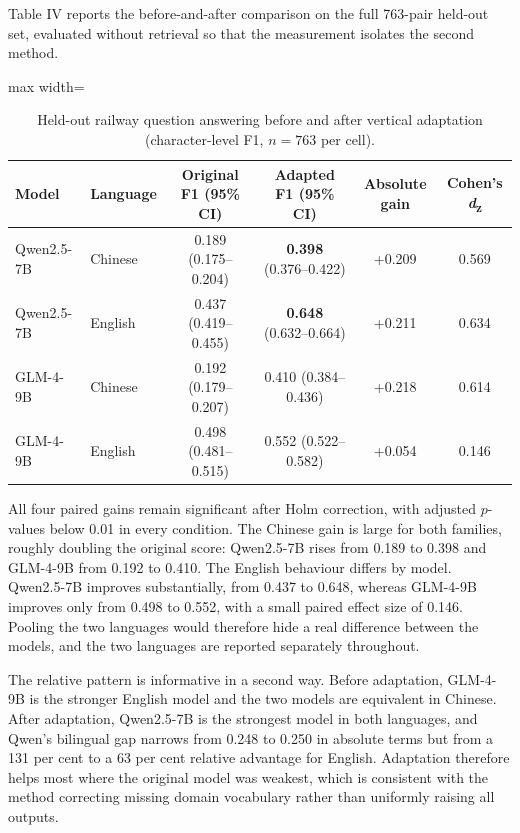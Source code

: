 \documentclass{article}
\begin{document}
Table IV reports the before-and-after comparison on the full 763-pair held-out set, evaluated without retrieval so that the measurement isolates the second method.

\begin{table}[ht]
\centering
\caption{Held-out railway question answering before and after vertical adaptation (character-level F1, $n=763$ per cell).}

\small
\begin{adjustbox}{max width=\linewidth}
\begin{tabular}{llcccc}
\toprule
Model & Language & Original F1 (95\% CI) & Adapted F1 (95\% CI) & Absolute gain & Cohen's \emph{d}\textsubscript{z} \\
\midrule
Qwen2.5-7B & Chinese & 0.189 (0.175--0.204) & \textbf{0.398} (0.376--0.422) & +0.209 & 0.569 \\
Qwen2.5-7B & English & 0.437 (0.419--0.455) & \textbf{0.648} (0.632--0.664) & +0.211 & 0.634 \\
GLM-4-9B & Chinese & 0.192 (0.179--0.207) & 0.410 (0.384--0.436) & +0.218 & 0.614 \\
GLM-4-9B & English & 0.498 (0.481--0.515) & 0.552 (0.522--0.582) & +0.054 & 0.146 \\
\bottomrule
\end{tabular}
\end{adjustbox}
\end{table}

All four paired gains remain significant after Holm correction, with adjusted $p$-values below 0.01 in every condition. The Chinese gain is large for both families, roughly doubling the original score: Qwen2.5-7B rises from 0.189 to 0.398 and GLM-4-9B from 0.192 to 0.410. The English behaviour differs by model. Qwen2.5-7B improves substantially, from 0.437 to 0.648, whereas GLM-4-9B improves only from 0.498 to 0.552, with a small paired effect size of 0.146. Pooling the two languages would therefore hide a real difference between the models, and the two languages are reported separately throughout.

The relative pattern is informative in a second way. Before adaptation, GLM-4-9B is the stronger English model and the two models are equivalent in Chinese. After adaptation, Qwen2.5-7B is the strongest model in both languages, and Qwen's bilingual gap narrows from 0.248 to 0.250 in absolute terms but from a 131 per cent to a 63 per cent relative advantage for English. Adaptation therefore helps most where the original model was weakest, which is consistent with the method correcting missing domain vocabulary rather than uniformly raising all outputs.
\end{document}

